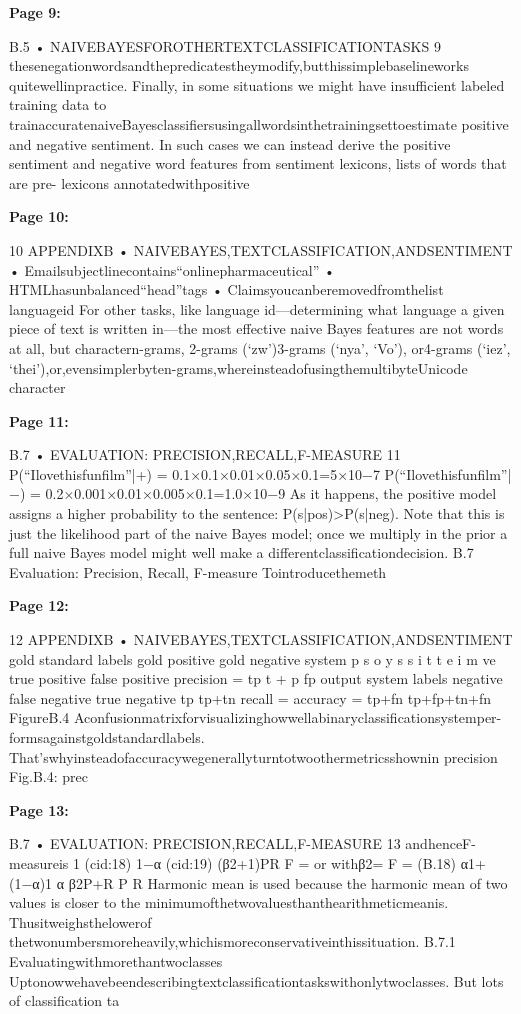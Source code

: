 \documentclass[11pt,a4paper]{article}
\begin{document}
\textbf{Page 9:}

B.5 • NAIVEBAYESFOROTHERTEXTCLASSIFICATIONTASKS 9
thesenegationwordsandthepredicatestheymodify,butthissimplebaselineworks
quitewellinpractice.
Finally, in some situations we might have insufficient labeled training data to
trainaccuratenaiveBayesclassifiersusingallwordsinthetrainingsettoestimate
positive and negative sentiment. In such cases we can instead derive the positive
sentiment and negative word features from sentiment lexicons, lists of words that are pre-
lexicons
annotatedwithpositive

\textbf{Page 10:}

10 APPENDIXB • NAIVEBAYES,TEXTCLASSIFICATION,ANDSENTIMENT
• Emailsubjectlinecontains“onlinepharmaceutical”
• HTMLhasunbalanced“head”tags
• Claimsyoucanberemovedfromthelist
languageid For other tasks, like language id—determining what language a given piece
of text is written in—the most effective naive Bayes features are not words at all,
but charactern-grams, 2-grams (‘zw’)3-grams (‘nya’, ‘Vo’), or4-grams (‘iez’,
‘thei’),or,evensimplerbyten-grams,whereinsteadofusingthemultibyteUnicode
character

\textbf{Page 11:}

B.7 • EVALUATION: PRECISION,RECALL,F-MEASURE 11
P(“Ilovethisfunfilm”|+) = 0.1×0.1×0.01×0.05×0.1=5×10−7
P(“Ilovethisfunfilm”|−) = 0.2×0.001×0.01×0.005×0.1=1.0×10−9
As it happens, the positive model assigns a higher probability to the sentence:
P(s|pos)>P(s|neg). Note that this is just the likelihood part of the naive Bayes
model; once we multiply in the prior a full naive Bayes model might well make a
differentclassificationdecision.
B.7 Evaluation: Precision, Recall, F-measure
Tointroducethemeth

\textbf{Page 12:}

12 APPENDIXB • NAIVEBAYES,TEXTCLASSIFICATION,ANDSENTIMENT
gold standard labels
gold positive gold negative
system p s o y s s i t t e i m ve true positive false positive precision = tp t + p fp
output
system
labels negative false negative true negative
tp tp+tn
recall = accuracy =
tp+fn tp+fp+tn+fn
FigureB.4 Aconfusionmatrixforvisualizinghowwellabinaryclassificationsystemper-
formsagainstgoldstandardlabels.
That’swhyinsteadofaccuracywegenerallyturntotwoothermetricsshownin
precision Fig.B.4: prec

\textbf{Page 13:}

B.7 • EVALUATION: PRECISION,RECALL,F-MEASURE 13
andhenceF-measureis
1 (cid:18) 1−α (cid:19) (β2+1)PR
F = or withβ2= F = (B.18)
α1+(1−α)1 α β2P+R
P R
Harmonic mean is used because the harmonic mean of two values is closer to the
minimumofthetwovaluesthanthearithmeticmeanis. Thusitweighsthelowerof
thetwonumbersmoreheavily,whichismoreconservativeinthissituation.
B.7.1 Evaluatingwithmorethantwoclasses
Uptonowwehavebeendescribingtextclassificationtaskswithonlytwoclasses.
But lots of classification ta
\end{document}
